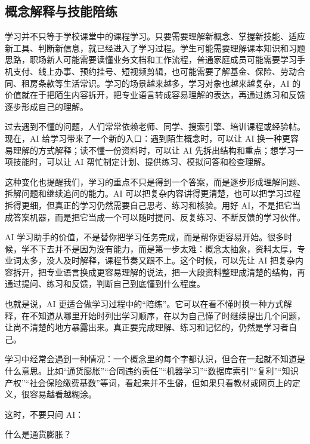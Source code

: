 \subsection{概念解释与技能陪练}

学习并不只等于学校课堂中的课程学习。只要需要理解新概念、掌握新技能、适应新工具、判断新信息，就已经进入了学习过程。学生可能需要理解课本知识和习题思路，职场新人可能需要读懂业务文档和工作流程，普通家庭成员可能需要学习手机支付、线上办事、预约挂号、短视频剪辑，也可能需要了解基金、保险、劳动合同、租房条款等生活常识。学习的场景越来越多，学习对象也越来越复杂，AI 的价值就在于把陌生内容拆开，把专业语言转成容易理解的表达，再通过练习和反馈逐步形成自己的理解。

过去遇到不懂的问题，人们常常依赖老师、同学、搜索引擎、培训课程或经验帖。现在，AI 给学习带来了一个新的入口：遇到陌生概念时，可以让 AI 换一种更容易理解的方式解释；读不懂一份资料时，可以让 AI 先拆出结构和重点；想学习一项技能时，可以让 AI 帮忙制定计划、提供练习、模拟问答和检查理解。

这种变化也提醒我们，学习的重点不只是得到一个答案，而是逐步形成理解问题、拆解问题和继续追问的能力。AI 可以把复杂内容讲得更清楚，也可以把学习过程拆得更细，但真正的学习仍然需要自己思考、练习和核验。用好 AI，不是把它当成答案机器，而是把它当成一个可以随时提问、反复练习、不断反馈的学习伙伴。

AI 学习助手的价值，不是替你把学习任务完成，而是帮你更容易开始。很多时候，学不下去并不是因为没有能力，而是第一步太难：概念太抽象，资料太厚，专业词太多，没人及时解释，课程节奏又跟不上。这个时候，可以先让 AI 把复杂内容拆开，把专业语言换成更容易理解的说法，把一大段资料整理成清楚的结构，再通过提问、练习和反馈，判断自己到底懂到什么程度。

也就是说，AI 更适合做学习过程中的“陪练”。它可以在看不懂时换一种方式解释，在不知道从哪里开始时列出学习顺序，在以为自己懂了时继续提出几个问题，让尚不清楚的地方暴露出来。真正要完成理解、练习和记忆的，仍然是学习者自己。


学习中经常会遇到一种情况：一个概念里的每个字都认识，但合在一起就不知道是什么意思。比如“通货膨胀”“合同违约责任”“机器学习”“数据库索引”“复利”“知识产权”“社会保险缴费基数”等词，看起来并不生僻，但如果只看教材或网页上的定义，很容易越看越糊涂。

这时，不要只问 AI：

\begin{tcolorbox}[promptbox]
什么是通货膨胀？
\end{tcolorbox}

